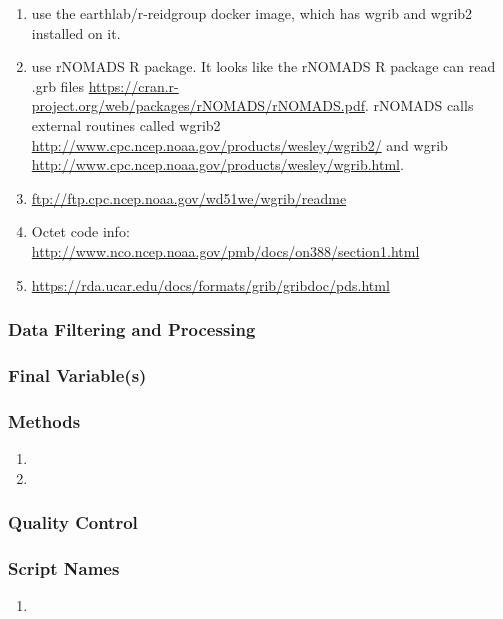 \begin{enumerate}


\item use the earthlab/r-reidgroup docker image, which has wgrib and wgrib2 installed on it.

\item use rNOMADS R package. It looks like the rNOMADS R package can read .grb files \url{https://cran.r-project.org/web/packages/rNOMADS/rNOMADS.pdf}. rNOMADS calls external routines called wgrib2 \url{http://www.cpc.ncep.noaa.gov/products/wesley/wgrib2/} and wgrib \url{http://www.cpc.ncep.noaa.gov/products/wesley/wgrib.html}.

\item \url{ftp://ftp.cpc.ncep.noaa.gov/wd51we/wgrib/readme}

\item Octet code info: \url{http://www.nco.ncep.noaa.gov/pmb/docs/on388/section1.html}

\item \url{https://rda.ucar.edu/docs/formats/grib/gribdoc/pds.html}

\end{enumerate}



\subsubsection*{Data Filtering and Processing}
\subsubsection*{Final Variable(s)}
\subsubsection*{Methods}
\begin{enumerate}
\item 
\item
\end{enumerate}
\subsubsection*{Quality Control}
\subsubsection*{Script Names}
\begin{enumerate}
\item 
\end{enumerate}
